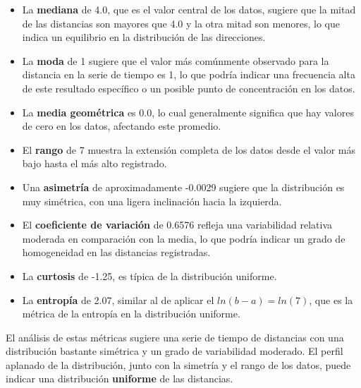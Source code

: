 \documentclass[11pt]{article} %
\begin{document}
	 \begin{itemize}
	 	
	 	\item La \textbf{mediana} de 4.0, que es el valor central de los datos, sugiere que la mitad de las distancias son mayores que 4.0 y la otra mitad son menores, lo que indica un equilibrio en la distribución de las direcciones.
	 	
	 	\item La \textbf{moda} de 1 sugiere que el valor más comúnmente observado para la distancia en la serie de tiempo es 1, lo que podría indicar una frecuencia alta de este resultado específico o un posible punto de concentración en los datos.
	 	
	 	\item La \textbf{media geométrica} es 0.0, lo cual generalmente significa que hay valores de cero en los datos, afectando este promedio.
	 	
	 	\item El \textbf{rango} de 7 muestra la extensión completa de los datos desde el valor más bajo hasta el más alto registrado.
	 	
	 	\item Una \textbf{asimetría} de aproximadamente -0.0029 sugiere que la distribución es muy simétrica, con una ligera inclinación hacia la izquierda.
	 	
	 	\item El \textbf{coeficiente de variación} de 0.6576 refleja una variabilidad relativa moderada en comparación con la media, lo que podría indicar un grado de homogeneidad en las distancias registradas.
	 	
	 	\item La \textbf{curtosis} de -1.25, es típica de la distribución uniforme.
	 	
	 	\item La \textbf{entropía} de 2.07, similar al de aplicar el $ln(b-a) = ln(7)$, que es la métrica de la entropía en la distribución uniforme.
	 \end{itemize}
	 
	 El análisis de estas métricas sugiere una serie de tiempo de distancias con una distribución bastante simétrica y un grado de variabilidad moderado. El perfil aplanado de la distribución, junto con la simetría y el rango de los datos, puede indicar una distribución \textbf{uniforme} de las distancias.
	  
\end{document}
